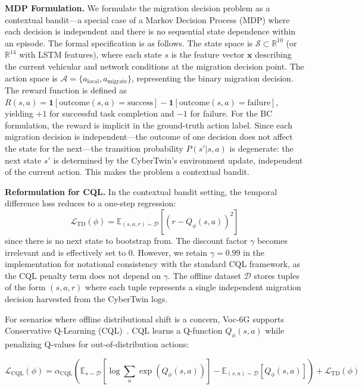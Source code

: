 \documentclass[journal,twoside]{IEEEtran}
\newcommand{\VocSixG}{Voc-6G}
\begin{document}
\textbf{MDP Formulation.}
We formulate the migration decision problem as a contextual bandit---a special case of a Markov Decision Process (MDP) where each decision is independent and there is no sequential state dependence within an episode. The formal specification is as follows. The state space is $\mathcal{S} \subset \mathbb{R}^{10}$ (or $\mathbb{R}^{14}$ with LSTM features), where each state $s$ is the feature vector $\mathbf{x}$ describing the current vehicular and network conditions at the migration decision point. The action space is $\mathcal{A} = \{a_{\text{local}}, a_{\text{migrate}}\}$, representing the binary migration decision. The reward function is defined as $R(s, a) = \mathbf{1}[\text{outcome}(s, a) = \text{success}] - \mathbf{1}[\text{outcome}(s, a) = \text{failure}]$, yielding $+1$ for successful task completion and $-1$ for failure. For the BC formulation, the reward is implicit in the ground-truth action label. Since each migration decision is independent---the outcome of one decision does not affect the state for the next---the transition probability $P(s' | s, a)$ is degenerate: the next state $s'$ is determined by the CyberTwin's environment update, independent of the current action. This makes the problem a contextual bandit.

\textbf{Reformulation for CQL.}
In the contextual bandit setting, the temporal difference loss reduces to a one-step regression:
\begin{equation}
\mathcal{L}_{\text{TD}}(\phi) = \mathbb{E}_{(s,a,r) \sim \mathcal{D}} \left[ \left( r - Q_\phi(s, a) \right)^2 \right]
\label{eq:td_loss}
\end{equation}
since there is no next state to bootstrap from. The discount factor $\gamma$ becomes irrelevant and is effectively set to 0. However, we retain $\gamma=0.99$ in the implementation for notational consistency with the standard CQL framework, as the CQL penalty term does not depend on $\gamma$. The offline dataset $\mathcal{D}$ stores tuples of the form $(s, a, r)$ where each tuple represents a single independent migration decision harvested from the CyberTwin logs.

For scenarios where offline distributional shift is a concern, \VocSixG{} supports Conservative Q-Learning (CQL)~\cite{kumar2020cql}. CQL learns a Q-function $Q_\phi(s, a)$ while penalizing Q-values for out-of-distribution actions:

\begin{equation}
\mathcal{L}_{\text{CQL}}(\phi) = \alpha_{\text{CQL}} \left( \mathbb{E}_{s \sim \mathcal{D}} \left[ \log \sum_a \exp(Q_\phi(s, a)) \right] - \mathbb{E}_{(s,a) \sim \mathcal{D}}[Q_\phi(s, a)] \right) + \mathcal{L}_{\text{TD}}(\phi)
\label{eq:cql}
\end{equation}
\end{document}

